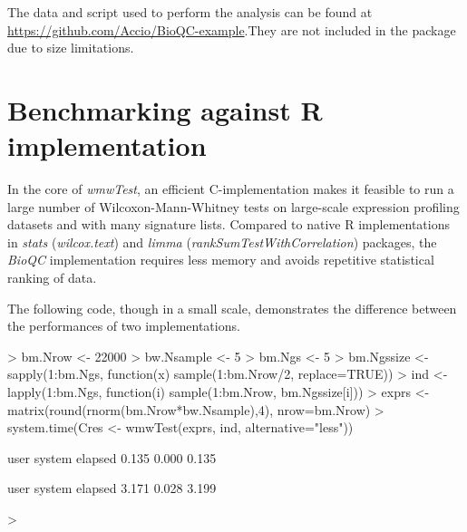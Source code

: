 \documentclass[11pt]{article}
\begin{document}
The data and script used to perform the analysis can be found at \url{https://github.com/Accio/BioQC-example}.They are not included in the package due to size limitations.

\section{Benchmarking against R implementation}
In the core of \textit{wmwTest}, an efficient C-implementation makes it feasible to run a large number of Wilcoxon-Mann-Whitney tests on large-scale expression profiling datasets and with many signature lists. Compared to native R implementations in \textit{stats} (\textit{wilcox.text}) and \textit{limma} (\textit{rankSumTestWithCorrelation}) packages, the \textit{BioQC} implementation requires less memory and avoids repetitive statistical ranking of data.

The following code, though in a small scale, demonstrates the difference between the performances of two implementations. 

\begin{Schunk}
\begin{Sinput}
> bm.Nrow <- 22000
> bw.Nsample <- 5
> bm.Ngs <- 5
> bm.Ngssize <- sapply(1:bm.Ngs, function(x) sample(1:bm.Nrow/2, replace=TRUE))
> ind <- lapply(1:bm.Ngs, function(i) sample(1:bm.Nrow, bm.Ngssize[i]))
> exprs <- matrix(round(rnorm(bm.Nrow*bw.Nsample),4), nrow=bm.Nrow)
> system.time(Cres <- wmwTest(exprs, ind, alternative="less"))
\end{Sinput}
\begin{Soutput}
   user  system elapsed 
  0.135   0.000   0.135 
\end{Soutput}
\begin{Soutput}
   user  system elapsed 
  3.171   0.028   3.199 
\end{Soutput}
\begin{Sinput}
> 
\end{Sinput}
\end{Schunk}
\end{document}
